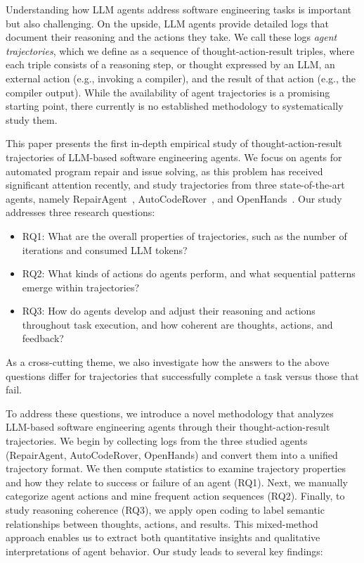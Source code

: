 \documentclass[conference,10pt]{IEEEtran}
\theoremstyle{definition}        %
\newcommand{\ra}{Repair\-Agent}
\newcommand{\oh}{Open\-Hands}
\newcommand{\acr}{Auto\-Code\-Rover}
\begin{document}
Understanding how LLM agents address software engineering tasks is important but also challenging.
On the upside, LLM agents provide detailed logs that document their reasoning and the actions they take.
We call these logs \emph{agent trajectories}, which we define as a sequence of thought-action-result triples, where each triple consists of a reasoning step, or thought expressed by an LLM, an external action (e.g., invoking a compiler), and the result of that action (e.g., the compiler output).
While the availability of agent trajectories is a promising starting point, there currently is no established methodology to systematically study them.

This paper presents the first in-depth empirical study of thought-action-result trajectories of LLM-based software engineering agents.
We focus on agents for automated program repair and issue solving, as this problem has received significant attention recently, and study trajectories from three state-of-the-art agents, namely \ra{}~\cite{icse2025-RepairAgent}, \acr{}~\cite{zhang2024autocoderover}, and \oh{}~\cite{wang2024openhands}.
Our study addresses three research questions:
\begin{itemize}
	\item RQ1: What are the overall properties of trajectories, such as the number of iterations and consumed LLM tokens?
	\item RQ2: What kinds of actions do agents perform, and what sequential patterns emerge within trajectories?
	\item RQ3: How do agents develop and adjust their reasoning and actions throughout task execution, and how coherent are thoughts, actions, and feedback?
\end{itemize}
As a cross-cutting theme, we also investigate how the answers to the above questions differ for trajectories that successfully complete a task versus those that fail.

To address these questions, we introduce a novel methodology that analyzes LLM-based software engineering agents through their thought-action-result trajectories.
We begin by collecting logs from the three studied agents (RepairAgent, AutoCodeRover, OpenHands) and convert them into a unified trajectory format.
We then compute statistics to examine trajectory properties and how they relate to success or failure of an agent (RQ1).
Next, we manually categorize agent actions and mine frequent action sequences (RQ2).
Finally, to study reasoning coherence (RQ3), we apply open coding to label semantic relationships between thoughts, actions, and results.
This mixed-method approach enables us to extract both quantitative insights and qualitative interpretations of agent behavior. Our study leads to several key findings:
\end{document}
